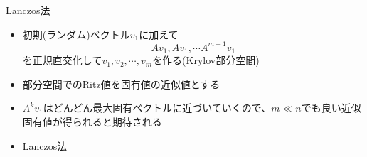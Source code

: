 \begin{frame}[t,fragile]{Lanczos法}
  \begin{itemize}
    \setlength{\itemsep}{1em}
  \item 初期(ランダム)ベクトル$v_1$に加えて
    \[
    Av_1, Av_1, \cdots A^{m-1}v_1
    \]
    を正規直交化して$v_1,v_2,\cdots,v_m$を作る(Krylov部分空間)
  \item 部分空間でのRitz値を固有値の近似値とする
  \item $A^kv_1$はどんどん最大固有ベクトルに近づいていくので、$m \ll n$でも良い近似固有値が得られると期待される
  \item Lanczos法
  \end{itemize}
\end{frame}
